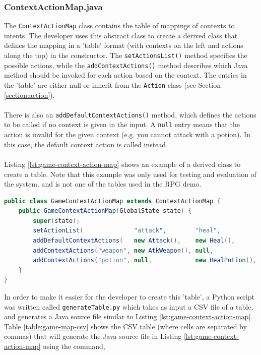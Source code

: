 \documentclass[11pt]{article}
\begin{document}
\subsubsection{ContextActionMap.java}
\label{section:context-action-map}

The \texttt{ContextActionMap} class contains the table of mappings of contexts to intents. The developer uses this abstract class to create a derived class that defines the mapping in a 'table' format (with contexts on the left and actions along the top) in the constructor. The \texttt{setActionsList()} method specifies the possible actions, while the \texttt{addContextActions()} method describes which Java method should be invoked for each action based on the context. The entries in the 'table' are either null or inherit from the \texttt{Action} class (see Section \ref{section:action}).
\\
\\
There is also an \texttt{addDefaultContextActions()} method, which defines the actions to be called if no context is given in the input. A \texttt{null} entry means that the action is invalid for the given context (e.g. you cannot attack with a potion). In this case, the default context action is called instead.
\\
\\
Listing \ref{lst:game-context-action-map} shows an example of a derived class to create a table. Note that this example was only used for testing and evaluation of the system, and is not one of the tables used in the RPG demo.

\begin{lstlisting}[language=Java, caption=Example of a ContextActionMap, label={lst:game-context-action-map}]
public class GameContextActionMap extends ContextActionMap {
    public GameContextActionMap(GlobalState state) {
        super(state);
        setActionList(              "attack",        "heal",           "move");
        addDefaultContextActions(   new Attack(),    new Heal(),       new Move());
        addContextActions("weapon", new AtkWeapon(), null,             null);
        addContextActions("potion", null,            new HealPotion(), null);
    }
}
\end{lstlisting}

In order to make it easier for the developer to create this 'table', a Python script was written called \texttt{generateTable.py} which takes as input a CSV file of a table, and generates a Java source file similar to Listing \ref{lst:game-context-action-map}. Table \ref{table:game-map-csv} shows the CSV table (where cells are separated by commas) that will generate the Java source file in Listing \ref{lst:game-context-action-map} using the command, 
\end{document}

